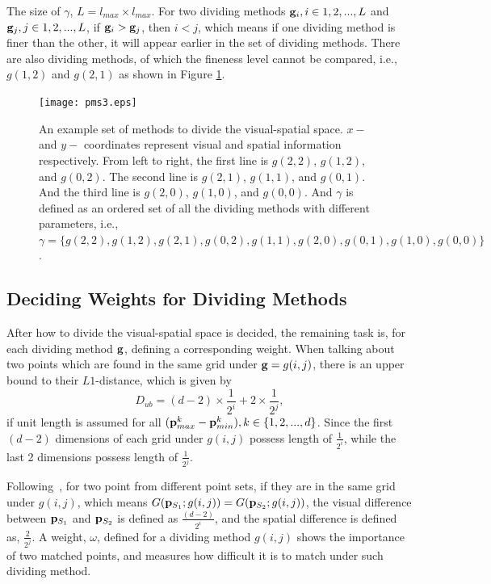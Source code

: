 The size of $\gamma$, $L=l_{max} \times l_{max}$. For two dividing methods ${\bf g}_i,i \in {1,2,...,L}$ and ${\bf g}_j,j \in {1,2,...,L}$, if ${\bf g}_i>{\bf g}_j$, then $i<j$, which means if one dividing method is finer than the other, it will appear earlier in the set of dividing methods. There are also dividing methods, of which the fineness level cannot be compared, i.e., $g(1,2)$ and $g(2,1)$ as shown in Figure \ref{fig:p3}.


\begin{figure}
\centering
\texttt{[image: pms3.eps]}
\caption[Visual-spatial space dividing]{An example set of methods to divide the visual-spatial space. $x-$ and $y-$ coordinates represent visual and spatial information respectively. From left to right, the first line is $g(2,2)$, $g(1,2)$, and $g(0,2)$. The second line is $g(2,1)$, $g(1,1)$, and $g(0,1)$. And the third line is $g(2,0)$, $g(1,0)$, and $g(0,0)$. And $\gamma$ is defined as an ordered set of all the dividing methods with different parameters, i.e., $\gamma=\{g(2,2),g(1,2),g(2,1),g(0,2),g(1,1),g(2,0),g(0,1),g(1,0),g(0,0)\}$.}
\label{fig:p3}
\end{figure}



\subsection{Deciding Weights for Dividing Methods}
After how to divide the visual-spatial space is decided, the remaining task is, for each dividing method $\bf g$, defining a corresponding weight.
When talking about two points which are found in the same grid under ${\bf g}=g(i,j)$, there is an upper bound to their $L1$-distance, which is given by
\[D_{ub}=  {(d-2)\times \frac 1 {2^i} +2\times \frac 1 {2^j} } ,
\]
 if unit length is assumed for all $({\bf p}_{max}^k - {\bf p}_{min}^k ),k \in \{1,2,...,d\}$. Since the first $(d-2)$ dimensions of each grid under $g(i,j)$ possess length of $\frac 1 {2^i}$, while the last 2 dimensions possess length of  $\frac 1 {2^j}$.



Following~\citep{pmk}, for two point from different point sets, if they are in the same grid under $g(i,j)$, which means $G({\bf p}_{S_1};g(i,j))=G({\bf p}_{S_2};g(i,j))$, the visual difference between ${\bf p}_{S_1}$ and ${\bf p}_{S_2}$  is defined as $ \frac {(d-2)}{2^i}$, and the spatial difference is defined as, $ \frac 2 {2^j}$.
A weight, $\omega$, defined for a dividing method $g(i,j)$ shows the importance of two matched points, and measures how difficult it is to match under such dividing method.


